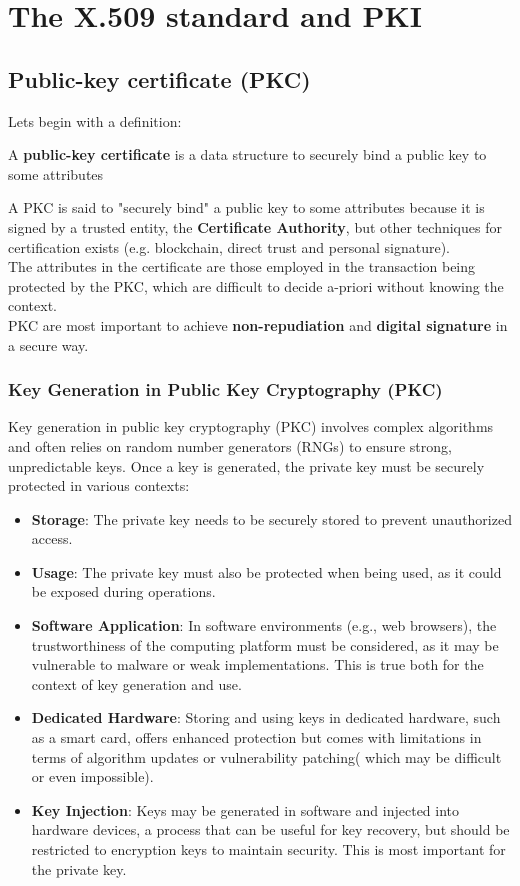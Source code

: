 \chapter{The X.509 standard and PKI}
\section{Public-key certificate (PKC)}
Lets begin with a definition:
\begin{boxH}
  A \textbf{public-key certificate} is a data structure to securely bind a
  public key to some attributes
\end{boxH}
A PKC is said to "securely bind" a public key to some attributes
because it is signed by a trusted entity, the \textbf{Certificate
Authority}, but other techniques for certification exists (e.g.
blockchain, direct trust and personal signature).\\
The attributes in the certificate are those employed in the
transaction being protected by the PKC, which are difficult to decide
a-priori without knowing the context.\\
PKC are most important to achieve \textbf{non-repudiation} and 
\textbf{digital signature} in a secure way.
\subsection{Key Generation in Public Key Cryptography (PKC)}

Key generation in public key cryptography (PKC) involves complex
algorithms and often relies on random number generators (RNGs) to
ensure strong, unpredictable keys. Once a key is generated, the
private key must be securely protected in various contexts:

\begin{itemize}
  \item \textbf{Storage}: The private key needs to be securely
    stored to prevent unauthorized access.
  \item \textbf{Usage}: The private key must also be protected when
    being used, as it could be exposed during operations.
  \item \textbf{Software Application}: In software environments
    (e.g., web browsers), the trustworthiness of the computing
    platform must be considered, as it may be vulnerable to malware
    or weak implementations. This is true both for the context of
    key generation and use.
  \item \textbf{Dedicated Hardware}: Storing and using keys in
    dedicated hardware, such as a smart card, offers enhanced
    protection but comes with limitations in terms of algorithm
    updates or vulnerability patching( which may be difficult or
    even impossible).
  \item \textbf{Key Injection}: Keys may be generated in software
    and injected into hardware devices, a process that can be useful
    for key recovery, but should be restricted to encryption keys to
    maintain security. This is most important for the private key. 
\end{itemize}

